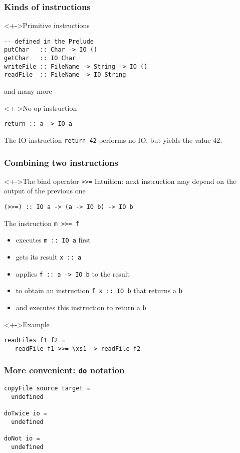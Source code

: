 \documentclass{beamer}
\begin{document}
\begin{frame}[fragile]
  \frametitle{Kinds of instructions}
  \begin{block}<+->{Primitive instructions}
\begin{lstlisting}
-- defined in the Prelude
putChar   :: Char -> IO ()
getChar   :: IO Char
writeFile :: FileName -> String -> IO ()
readFile  :: FileName -> IO String
\end{lstlisting}
and many more
  \end{block}
  \begin{block}<+->{No op instruction}
\begin{lstlisting}
return :: a -> IO a
\end{lstlisting}
    The IO instruction \texttt{return 42} performs no IO, but yields the value 42.
  \end{block}
\end{frame}
\begin{frame}[fragile]
  \frametitle{Combining two instructions}
  \begin{block}<+->{The bind operator \texttt{>>=}}
    Intuition:  next instruction may depend on the output of the previous one
\begin{lstlisting}
(>>=) :: IO a -> (a -> IO b) -> IO b
\end{lstlisting}
    The instruction \texttt{m >>= f}
    \begin{itemize}
    \item executes \texttt{m :: IO a} first
    \item gets its result \texttt{x :: a}
    \item applies \texttt{f :: a -> IO b} to the result
    \item to obtain an instruction \texttt{f x :: IO b} that returns a \texttt{b}
    \item and executes this instruction to return a \texttt{b}
    \end{itemize}
  \end{block}
  \begin{block}<+->{Example}
\begin{lstlisting}
readFiles f1 f2 =
   readFile f1 >>= \xs1 -> readFile f2 
\end{lstlisting}
  \end{block}
\end{frame}
\begin{frame}[fragile]
  \frametitle{More convenient: \texttt{do} notation}
\begin{lstlisting}
copyFile source target =
  undefined

doTwice io =
  undefined

doNot io =
  undefined
\end{lstlisting}
\end{frame}
\end{document}
